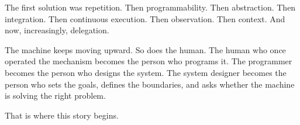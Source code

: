 \documentclass[11pt,twoside]{book}
\begin{document}
The first solution was repetition.
Then programmability.
Then abstraction.
Then integration.
Then continuous execution.
Then observation.
Then context.
And now, increasingly, delegation.

The machine keeps moving upward.
So does the human.
The human who once operated the mechanism becomes the person who programs it.
The programmer becomes the person who designs the system.
The system designer becomes the person who sets the goals, defines the boundaries, and asks whether the machine is solving the right problem.

That is where this story begins.
\end{document}
